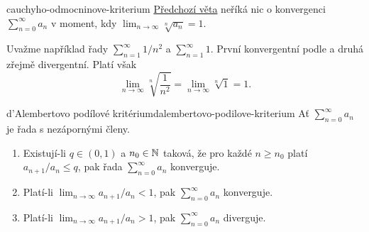 \begin{warning}{}{cauchyho-odmocninove-kriterium}
 \hyperref[thm:cauchyho-odmocninove-kriterium]{Předchozí věta} neříká nic o
 konvergenci $\sum_{n = 0}^{\infty} a_n$ v moment, kdy $\lim_{n \to \infty}
 \sqrt[n]{a_n} = 1$.

 Uvažme například řady $\sum_{n=1}^{\infty} 1 / n^2$ a $\sum_{n=1}^{\infty} 1$.
 První konvergentní podle  a druhá zřejmě
 divergentní. Platí však
 \[
  \lim_{n \to \infty} \sqrt[n]{\frac{1}{n^2}} = \lim_{n \to \infty} \sqrt[n]{1}
  = 1.
 \]
\end{warning}

\begin{theorem}{d'Alembertovo podílové kritérium}{dalembertovo-podilove-kriterium}
 Ať $\sum_{n = 0}^{\infty} a_n$ je řada s nezápornými členy.
 \begin{enumerate}[label=(\alph*)]
  \item Existují-li $q \in (0,1)$ a $n_0 \in \mathbb{N}$ taková, že pro každé $n \geq
   n_0$ platí $a_{n+1} / a_n \leq q$, pak řada $\sum_{n = 0}^{\infty} a_n$
   konverguje.
  \item Platí-li $\lim_{n \to \infty} a_{n+1} / a_n < 1$, pak $\sum_{n =
   0}^{\infty} a_n$ konverguje.
  \item Platí-li $\lim_{n \to \infty} a_{n+1} / a_n > 1$, pak $\sum_{n =
   0}^{\infty} a_n$ diverguje.
 \end{enumerate}
\end{theorem}
